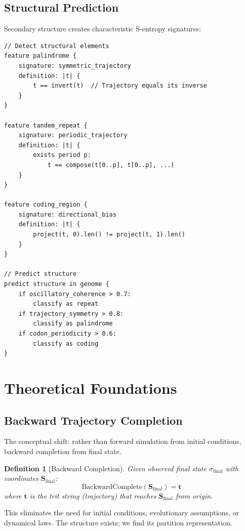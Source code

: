 \documentclass[twocolumn,10pt]{article}
\newtheorem{definition}[theorem]{Definition}
\theoremstyle{remark}
\newcommand{\Scoord}{\mathbf{S}}
\begin{document}
\subsection{Structural Prediction}

Secondary structure creates characteristic S-entropy signatures:

\begin{lstlisting}[style=tritcode]
// Detect structural elements
feature palindrome {
    signature: symmetric_trajectory
    definition: |t| {
        t == invert(t)  // Trajectory equals its inverse
    }
}

feature tandem_repeat {
    signature: periodic_trajectory
    definition: |t| {
        exists period p:
            t == compose(t[0..p], t[0..p], ...)
    }
}

feature coding_region {
    signature: directional_bias
    definition: |t| {
        project(t, 0).len() != project(t, 1).len()
    }
}

// Predict structure
predict structure in genome {
    if oscillatory_coherence > 0.7:
        classify as repeat
    if trajectory_symmetry > 0.8:
        classify as palindrome
    if codon_periodicity > 0.6:
        classify as coding
}
\end{lstlisting}

\section{Theoretical Foundations}

\subsection{Backward Trajectory Completion}

The conceptual shift: rather than forward simulation from initial conditions, backward completion from final state.

\begin{definition}[Backward Completion]
Given observed final state $\sigma_{\text{final}}$ with coordinates $\Scoord_{\text{final}}$:
\begin{equation}
\text{BackwardComplete}(\Scoord_{\text{final}}) = \mathbf{t}
\end{equation}
where $\mathbf{t}$ is the trit string (trajectory) that reaches $\Scoord_{\text{final}}$ from origin.
\end{definition}

This eliminates the need for initial conditions, evolutionary assumptions, or dynamical laws. The structure exists; we find its partition representation.
\end{document}
